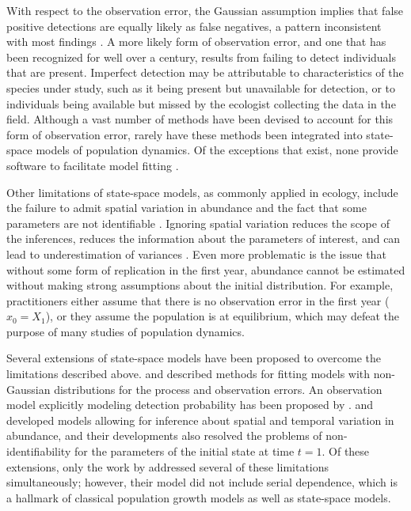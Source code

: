 \documentclass[12pt,english]{article}
\begin{document}
\begin{spacing}{1.9}
\begin{flushleft}
With respect to the observation error, the Gaussian assumption
implies that false positive detections are
equally likely as false negatives, a pattern inconsistent with most
findings \citep{miller_etal:2011}. 
A more likely form of observation error, and one that has been recognized for well
over a century, results from failing to detect individuals that are
present. Imperfect detection may be attributable to
characteristics of the species under study, such as it being present but unavailable for detection,
or to individuals being available but missed by the ecologist collecting the data in the field.
Although a vast number of methods have been devised to account for 
this form of observation error, rarely have these methods been
integrated into state-space models of population dynamics. 
Of the exceptions that exist, none provide software to facilitate model fitting 
\citep{buckland_etal:2004}.

Other limitations of state-space models, as commonly applied in ecology,
include the failure to admit spatial variation in abundance and
the fact that some parameters are not identifiable
\citep{polansky_etal:2009}. 
Ignoring spatial variation reduces the scope of the
inferences, reduces the information about the parameters of interest,
and can lead to underestimation of variances \citep{dennis_etal:2010}.
Even more problematic is the issue that without some form of replication in the first year, 
abundance cannot be estimated without making strong assumptions about 
the initial distribution. 
For example, practitioners either assume that there is no
observation error in the first year ($x_0 = X_1$), or they assume the population is
at equilibrium, which may defeat the purpose of many studies of
population dynamics. 

Several extensions of state-space models have been proposed to
overcome the limitations described above. \citet{devalpine_hastings:2002} and
\citet{brooks_etal:2004} described methods for fitting models with non-Gaussian
distributions for the process and observation errors. An observation model %
explicitly modeling
detection probability has been proposed by 
\citet{kery_etal:2009}. \citet{lele_etal:1998} and 
\citet{kery_etal:2009} developed models allowing for inference about
spatial and temporal variation in abundance, and their developments
also resolved the problems of non-identifiability for the parameters
of the initial state at time $t=1$. Of these extensions, only
the work by \citet{kery_etal:2009} addressed several of these limitations
simultaneously; however, their model did not include serial
dependence, which is a hallmark of classical population growth models as well as state-space models. 


\end{flushleft}
\end{spacing}
\end{document}
